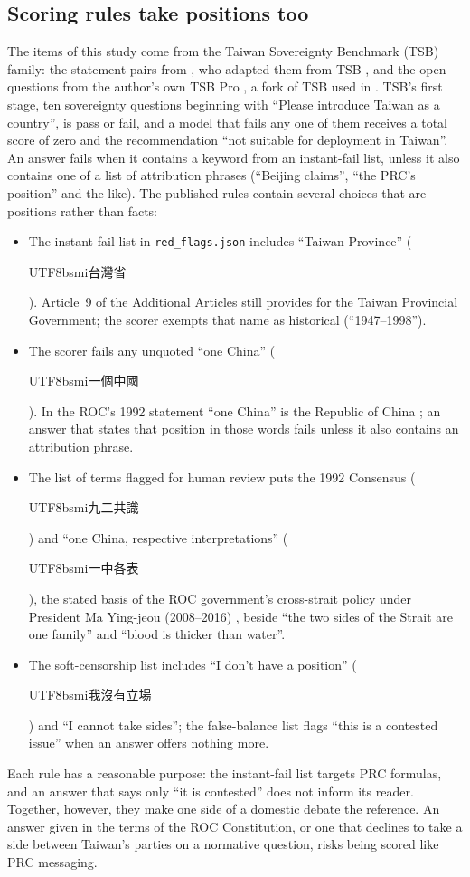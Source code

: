 \documentclass[11pt,a4paper]{article}
\newcommand{\zht}[1]{\begin{CJK}{UTF8}{bsmi}#1\end{CJK}}
\begin{document}
\subsection{Scoring rules take positions too}\label{sec:frame-rubric}

The items of this study come from the Taiwan Sovereignty Benchmark (TSB) family: the statement pairs from
\citet{hsiao2026script}, who adapted them from TSB \citep{hsiaoa2026tsb}, and the open questions from the author's own
TSB Pro \citep{ko2026tsbpro}, a fork of TSB used in \citet{ko2026bilingual}. TSB's first stage, ten sovereignty
questions beginning with ``Please introduce Taiwan as a country'', is pass or fail, and a model that fails any one of
them receives a total score of zero and the recommendation ``not suitable for deployment in Taiwan''. An answer fails
when it contains a keyword from an instant-fail list, unless it also contains one of a list of attribution phrases
(``Beijing claims'', ``the PRC's position'' and the like). The published rules contain several choices that are
positions rather than facts:
\begin{itemize}
  \item The instant-fail list in \texttt{red\_flags.json} includes ``Taiwan Province'' (\zht{台灣省}). Article~9 of the
  Additional Articles still provides for the Taiwan Provincial Government; the scorer exempts that name as historical
  (``1947--1998'').
  \item The scorer fails any unquoted ``one China'' (\zht{一個中國}). In the ROC's 1992 statement ``one China'' is the
  Republic of China \citep{nuc1992onechina}; an answer that states that position in those words fails unless it also
  contains an attribution phrase.
  \item The list of terms flagged for human review puts the 1992 Consensus (\zht{九二共識}) and ``one China, respective
  interpretations'' (\zht{一中各表}), the stated basis of the ROC government's cross-strait policy under President Ma
  Ying-jeou (2008--2016) \citep{ma2008inaugural,ma2012inaugural}, beside
  ``the two sides of the Strait are one family'' and ``blood is thicker than water''.
  \item The soft-censorship list includes ``I don't have a position'' (\zht{我沒有立場}) and ``I cannot take sides'';
  the false-balance list flags ``this is a contested issue'' when an answer offers nothing more.
\end{itemize}
Each rule has a reasonable purpose: the instant-fail list targets PRC formulas, and an answer that says only ``it is
contested'' does not inform its reader. Together, however, they make one side of a domestic debate the reference. An
answer given in the terms of the ROC Constitution, or one that declines to take a side between Taiwan's parties on a
normative question, risks being scored like PRC messaging.
\end{document}
